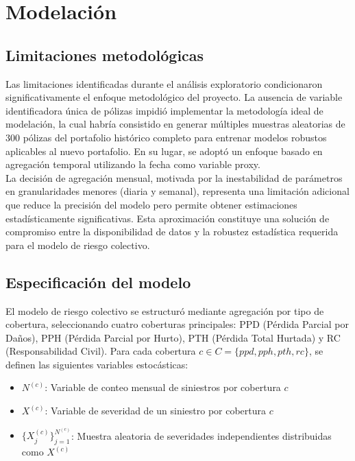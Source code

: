 \section{Modelación}

\subsection{Limitaciones metodológicas}

Las limitaciones identificadas durante el análisis exploratorio condicionaron significativamente el enfoque metodológico del proyecto. La ausencia de variable identificadora única de pólizas impidió implementar la metodología ideal de modelación, la cual habría consistido en generar múltiples muestras aleatorias de 300 pólizas del portafolio histórico completo para entrenar modelos robustos aplicables al nuevo portafolio. En su lugar, se adoptó un enfoque basado en agregación temporal utilizando la fecha como variable proxy.\\

La decisión de agregación mensual, motivada por la inestabilidad de parámetros en granularidades menores (diaria y semanal), representa una limitación adicional que reduce la precisión del modelo pero permite obtener estimaciones estadísticamente significativas. Esta aproximación constituye una solución de compromiso entre la disponibilidad de datos y la robustez estadística requerida para el modelo de riesgo colectivo.

\subsection{Especificación del modelo}

El modelo de riesgo colectivo se estructuró mediante agregación por tipo de cobertura, seleccionando cuatro coberturas principales: PPD (Pérdida Parcial por Daños), PPH (Pérdida Parcial por Hurto), PTH (Pérdida Total Hurtada) y RC (Responsabilidad Civil). Para cada cobertura $c \in C = \{ppd, pph, pth, rc\}$, se definen las siguientes variables estocásticas:

\begin{itemize}
\item $N^{(c)}$: Variable de conteo mensual de siniestros por cobertura $c$
\item $X^{(c)}$: Variable de severidad de un siniestro por cobertura $c$
\item $\{X^{(c)}_j\}_{j=1}^{N^{(c)}}$: Muestra aleatoria de severidades independientes distribuidas como $X^{(c)}$
\end{itemize}

